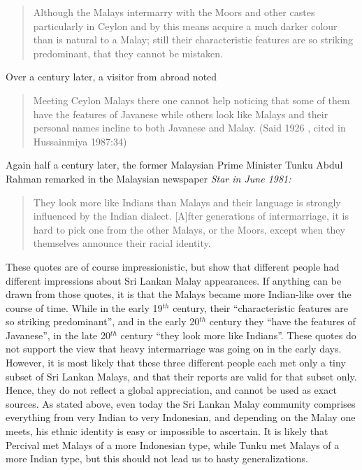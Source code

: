 \begin{quote}
Although the Malays intermarry with the Moors and other castes particularly in Ceylon and by this means acquire a much darker colour than is natural to a Malay; still their characteristic features are so striking predominant, that they cannot be mistaken.
\end{quote}

Over a century later, a visitor from abroad noted

\begin{quote}
Meeting Ceylon Malays there one cannot help noticing that some of them have the features of Javanese while others look like Malays and their personal names incline to both Javanese and Malay.
  (Said 1926 \nocite{Said1926}, cited in Hussainmiya 1987:34)
\end{quote}

Again half a century later, the former Malaysian Prime Minister Tunku Abdul Rahman remarked in the Malaysian newspaper \em Star \em in June 1981:

\begin{quote}
 They look more like Indians \el{} than Malays and their language is strongly influenced by the Indian dialect. \el{} [A]fter generations of intermarriage, it is hard to pick one from the other Malays, or the Moors, except when they themselves announce their racial identity. \citep[7]{Hussainmiya1987}
\end{quote}

These quotes are of course impressionistic, but show that different people had different impressions about Sri Lankan Malay appearances. If anything can be drawn from those quotes, it is that the Malays became more Indian-like over the course of time. While in the early 19$^{th}$ century, their ``characteristic features are so striking predominant'', and in the early 20$^{th}$ century they ``have the features of Javanese'', in the late 20$^{th}$ century ``they look more like Indians''. These quotes do not support the view that heavy intermarriage was going on in the early days. However, it is most likely that these three different people each met only a tiny subset of Sri Lankan Malays, and that their reports are valid for that subset only. Hence, they do not reflect a global appreciation, and cannot be used as exact sources. As stated above, even today the Sri Lankan Malay community comprises everything from very Indian to very Indonesian, and depending on the Malay one meets, his ethnic identity is easy or impossible to ascertain. It is likely that Percival met Malays of a more Indonesian type, while Tunku met Malays of a more Indian type, but this should not lead us to hasty generalizations.


